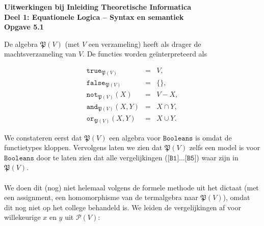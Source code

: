 \documentclass[a4paper,11pt]{article}
\begin{document}
{\bf Uitwerkingen bij Inleiding Theoretische Informatica\\
Deel 1: Equationele Logica -- Syntax en semantiek}\\[2em]


{\bf Opgave 5.1}

De algebra $\mathfrak{P}(V)$ (met $V$ een verzameling) heeft als drager de
machtsverzameling van $V$. De functies worden ge\"interpreteerd als

\begin{eqnarray*}
\texttt{true}_{\mathfrak{P}(V)}     & = & V , \\
\texttt{false}_{\mathfrak{P}(V)}    & = & \{\} , \\
\texttt{not}_{\mathfrak{P}(V)}(X)   & = & V - X , \\
\texttt{and}_{\mathfrak{P}(V)}(X,Y) & = & X \cap Y , \\
\texttt{or}_{\mathfrak{P}(V)}(X,Y)  & = & X \cup Y .
\end{eqnarray*}

We constateren eerst dat $\mathfrak{P}(V)$ een algebra voor
$\texttt{Booleans}$ is omdat de functietypes kloppen. Vervolgens laten we zien
dat $\mathfrak{P}(V)$ zelfs een model is voor $\texttt{Booleans}$ door te
laten zien dat alle vergelijkingen ($\texttt{[B1]} \ldots \texttt{[B5]}$) waar
zijn in $\mathfrak{P}(V)$.

\paragraph{}

We doen dit (nog) niet helemaal volgens de formele methode uit het dictaat
(met een assignment, een homomorphisme van de termalgebra naar
$\mathfrak{P}(V)$), omdat dit nog niet op het college behandeld is. We leiden
de vergelijkingen af voor willekeurige $x$ en $y$ uit $\mathcal{P}(V)$:
\end{document}
